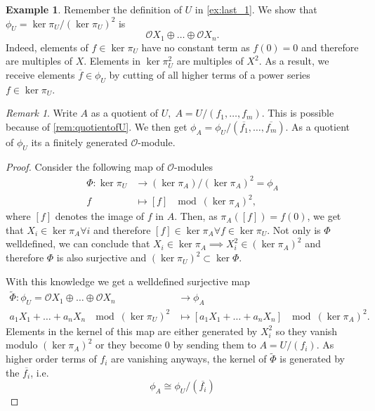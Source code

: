 \documentclass{article}
\theoremstyle{plain}%
\theoremstyle{definition}
\newtheorem{example}[theorem]{Example}
\theoremstyle{remark}
\newtheorem{remark}[theorem]{Remark}
\begin{document}
\begin{example}\label{ex:last_phi}
    Remember the definition of \(U\) in \cref{ex:last_1}.
    We show that \(\phi_U = \ker \pi_U/(\ker \pi_U)^2\) is
    \[
        \mathcal{O}X_1 \oplus \dots \oplus \mathcal{O}X_n.
    \]
    Indeed, elements of \(f \in \ker \pi_U\) have no constant term as \(f(0) = 0\) and therefore are multiples of \(X\).
    Elements in \(\ker \pi_U^2\) are multiples of \(X^2\). As a result, we receive elements \(\overline{f} \in \phi_U\) by
    cutting of all higher terms of a power series \(f \in \ker \pi_U\).
\end{example}

\begin{remark}\label{rem:tangentspace}
    Write \(A\) as a quotient of \(U,\; A = U/(f_1, \dots, f_m)\). 
    This is possible because of \cref{rem:quotientofU}.
    We then get \(\phi_A = \phi_U/(\overline{f_1}, \dots, \overline{f_m})\).
    As a quotient of \(\phi_U\) its a finitely generated \(\mathcal{O}\)-module.
\end{remark}
\begin{proof}
    Consider the following map of \(\mathcal{O}\)-modules
    \begin{align*}
        \Phi\colon \ker \pi_U &\to (\ker \pi_A)/(\ker \pi_A)^2 = \phi_A\\
        f &\mapsto [f] \; \mod (\ker \pi_A)^2,
    \end{align*}
    where \([f]\) denotes the image of \(f\) in \(A\).
    Then, as \(\pi_A([f]) = f(0)\), we get that \(X_i \in \ker \pi_A \forall i\)
    and therefore \([f] \in \ker \pi_A \forall f \in \ker \pi_U\). Not only is \(\Phi\) welldefined,
    we can conclude that \(X_i \in \ker \pi_A \implies X_i^2 \in (\ker \pi_A)^2\)
    and therefore \(\Phi\) is also surjective and \((\ker \pi_U)^2 \subset \ker \Phi\).
    
    With this knowledge we get a welldefined surjective map
    \begin{align*}
        \tilde \Phi\colon \phi_U = \mathcal{O}X_1 \oplus \dots \oplus \mathcal{O}X_n &\to \phi_A\\
        a_1X_1 + \dots + a_nX_n \; \mod (\ker \pi_U)^2 &\mapsto [a_1X_1 + \dots + a_nX_n] \; \mod (\ker \pi_A)^2.
    \end{align*}
    Elements in the kernel of this map are either generated by \(X_i^2\) so they vanish modulo \((\ker \pi_A)^2\)
    or they become 0 by sending them to \(A = U/(f_i)\).
    As higher order terms of \(f_i\) are vanishing anyways, 
    the kernel of \(\tilde \Phi\) is generated by the \(\overline{f_i}\), i.e.
    \[
        \phi_A \cong \phi_U/(\overline{f_i})  
    \]
\end{proof}
\end{document}
